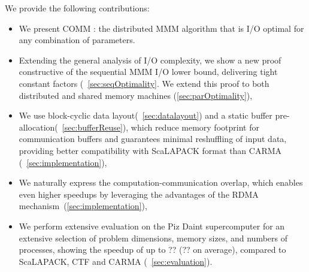 \documentclass[sigplan,review,anonymous]{acmart}\settopmatter{printfolios=true,printccs=false,printacmref=false}
\newcommand\mac[1]{\textcolor{red}{[Mac: #1]}}
\begin{document}
We provide the following contributions:

\begin{itemize}[leftmargin=1em]
%
\item We present COMM : the distributed MMM algorithm that is I/O optimal for 
any combination of parameters.
%
%
\item Extending the general analysis of I/O complexity, we
show a new proof constructive of the sequential MMM I/O lower bound,
delivering tight constant factors (~\cref{sec:seqOptimality}. We extend this 
proof to both distributed and shared memory machines (\cref{sec:parOptimality}),
%
%
\item We use block-cyclic data layout(~\cref{sec:datalayout}) and a static 
buffer pre-allocation(~\cref{sec:bufferReuse}), which reduce
memory footprint for communication buffers and guarantees minimal reshuffling
of input data, providing better compatibility with ScaLAPACK format than CARMA
(~\cref{sec:implementation}),
%
\item We naturally express the computation-communication overlap, which enables 
even higher speedups by
leveraging the advantages of the RDMA mechanism~(\cref{sec:implementation}),
%
\item We perform extensive evaluation on the Piz Daint supercomputer for an 
extensive selection of problem
dimensions, memory sizes, and numbers of
processes, showing the speedup of up to ?? (?? on average), compared to 
ScaLAPACK, CTF and CARMA (~\cref{sec:evaluation}).
%
\end{itemize}

%
\end{document}
